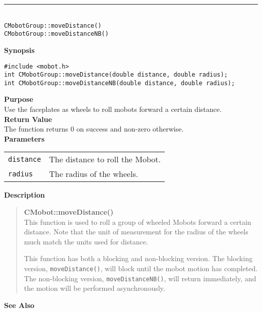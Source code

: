 \noindent
\vspace{5pt}
\rule{4.5in}{0.015in}\\
\noindent
{\LARGE \texttt{CMobotGroup::moveDistance()}}\\
{\LARGE \texttt{CMobotGroup::moveDistanceNB()}}\\
{}

\noindent
{\bf Synopsis}
\vspace{-8pt}
\begin{verbatim}
#include <mobot.h>
int CMobotGroup::moveDistance(double distance, double radius);
int CMobotGroup::moveDistanceNB(double distance, double radius);
\end{verbatim}

\noindent
{\bf Purpose}\\
Use the faceplates as wheels to roll mobots forward a certain distance.\\

\noindent
{\bf Return Value}\\
The function returns 0 on success and non-zero otherwise.\\

\noindent
{\bf Parameters}\\
\vspace{-0.1in}
\begin{description}
\item               
\begin{tabular}{p{15 mm}p{145 mm}}
\texttt{distance} & The distance to roll the Mobot.\\
\texttt{radius} & The radius of the wheels.\\
\end{tabular}
\end{description}

\noindent
{\bf Description}\\
\vspace{-12pt}
\begin{quote}
{\bf CMobot::moveDistance()}\\
This function is used to roll a group of wheeled Mobots forward a certain distance. 
Note that the unit of measurement for the radius of the wheels much match the units 
used for distance.

This function has both a blocking and non-blocking version.
The blocking version, \texttt{moveDistance()}, will block until the
mobot motion has completed. The non-blocking version, \texttt{moveDistanceNB()},
will return immediately, and the motion will be performed asynchronously.\\
\end{quote}

\noindent
{\bf See Also}\\

